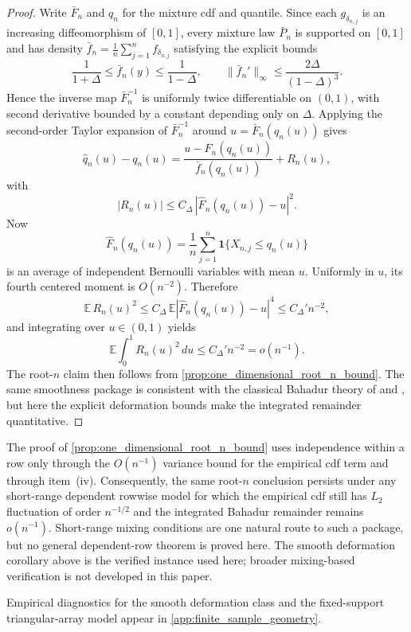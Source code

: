 \begin{proof}
Write $\bar F_n$ and $q_n$ for the mixture cdf and quantile. Since each
$g_{\delta_{n,j}}$ is an increasing diffeomorphism of $[0,1]$, every mixture law
$\bar P_n$ is supported on $[0,1]$ and has density
$\bar f_n=\frac1n\sum_{j=1}^n f_{\delta_{n,j}}$ satisfying the explicit bounds
\[
  \frac{1}{1+\Delta}\le \bar f_n(y)\le \frac{1}{1-\Delta},
  \qquad
  \|\bar f_n'\|_\infty\le \frac{2\Delta}{(1-\Delta)^3}.
\]
Hence the inverse map $\bar F_n^{-1}$ is uniformly twice differentiable on
$(0,1)$, with second derivative bounded by a constant depending only on
$\Delta$. Applying the second-order Taylor expansion of $\bar F_n^{-1}$ around
$u=\bar F_n(q_n(u))$ gives
\[
  \widehat q_n(u)-q_n(u)
  = \frac{u-\widehat F_n(q_n(u))}{\bar f_n(q_n(u))} + R_n(u),
\]
with
\[
  |R_n(u)|\le C_\Delta\,|\widehat F_n(q_n(u))-u|^2.
\]
Now
\[
  \widehat F_n(q_n(u))
  =\frac1n\sum_{j=1}^n \mathbf 1\{X_{n,j}\le q_n(u)\}
\]
is an average of independent Bernoulli variables with mean $u$. Uniformly in
$u$, its fourth centered moment is $O(n^{-2})$. Therefore
\[
  \mathbb E\,R_n(u)^2\le C_\Delta\,\mathbb E|\widehat F_n(q_n(u))-u|^4
  \le C_\Delta' n^{-2},
\]
and integrating over $u\in(0,1)$ yields
\[
  \mathbb E\int_0^1 R_n(u)^2\,du\le C_\Delta' n^{-2}=o(n^{-1}).
\]
The root-$n$ claim then follows from \cref{prop:one_dimensional_root_n_bound}.
The same smoothness package is consistent with the classical Bahadur theory of
\citet{Bahadur1966} and \citet[Chapter~21]{vanDerVaart1998}, but here the
explicit deformation bounds make the integrated remainder quantitative.
\end{proof}

\begin{remark}
The proof of \cref{prop:one_dimensional_root_n_bound} uses independence within a
row only through the $O(n^{-1})$ variance bound for the empirical cdf term and
through item~(iv). Consequently, the same root-$n$ conclusion persists under any
short-range dependent rowwise model for which the empirical cdf still has
$L_2$ fluctuation of order $n^{-1/2}$ and the integrated Bahadur remainder
remains $o(n^{-1})$. Short-range mixing conditions are one natural route to such
a package, but no general dependent-row theorem is proved here. The smooth
deformation corollary above is the verified instance used here; broader
mixing-based verification is not developed in this paper.
\end{remark}

Empirical diagnostics for the smooth deformation class and the fixed-support
triangular-array model appear in \cref{app:finite_sample_geometry}.

